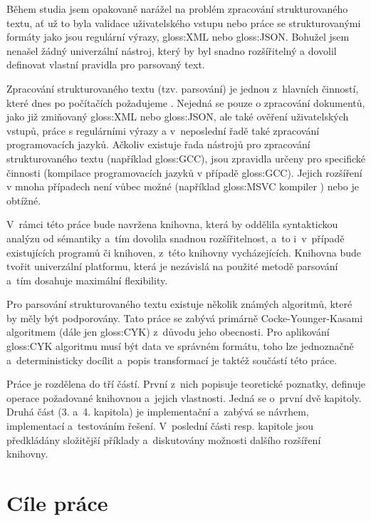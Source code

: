 \begin{introduction}
	Během studia jsem opakovaně narážel na problém zpracování strukturovaného textu, ať už to byla validace uživatelského vstupu nebo práce se strukturovanými formáty jako jsou regulární výrazy, \gls{gloss:XML} nebo \gls{gloss:JSON}. Bohužel jsem nenašel žádný univerzální nástroj, který by byl snadno rozšířitelný a dovolil definovat vlastní pravidla pro parsovaný text.
	
	Zpracování strukturovaného textu (tzv. parsování) je jednou z~hlavních činností, které dnes po počítačích požadujeme \cite{MartinKocickaLRParsing}.
	Nejedná se pouze o zpracování dokumentů, jako již zmiňovaný \gls{gloss:XML} nebo \gls{gloss:JSON}, ale také ověření uživatelských vstupů, práce s regulárními výrazy a v~neposlední řadě také zpracování programovacích jazyků. Ačkoliv existuje řada nástrojů pro zpracování strukturovaného textu (například \gls{gloss:GCC}), jsou zpravidla určeny pro specifické činnosti (kompilace programovacích jazyků v případě \gls{gloss:GCC}). Jejich rozšíření v mnoha případech není vůbec možné (například \gls{gloss:MSVC} kompiler \cite{MSVCIntermediate}) nebo je obtížné.
	
	V~rámci této práce bude navržena knihovna, která by oddělila syntaktickou analýzu od sémantiky a~tím dovolila snadnou rozšířitelnost, a~to i~v~případě existujících programů či knihoven, z~této knihovny vycházejících. Knihovna bude tvořit univerzální platformu, která je nezávislá na použité metodě parsování a~tím dosahuje maximální flexibility.
	
	Pro parsování strukturovaného textu existuje několik známých algoritmů, které by měly být podporovány. Tato práce se zabývá primárně Cocke-Younger-Kasami algoritmem (dále jen \gls{gloss:CYK}) z~důvodu jeho obecnosti. Pro aplikování \gls{gloss:CYK} algoritmu musí být data ve správném formátu, toho lze jednoznačně a~deterministicky docílit a~popis transformací je taktéž součástí této práce.
	
	Práce je rozdělena do tří částí. První z~nich popisuje teoretické poznatky, definuje operace požadované knihovnou a~jejich vlastnosti. Jedná se o~první dvě kapitoly. Druhá část (3. a~4. kapitola) je implementační a~zabývá se návrhem, implementací a~testováním řešení. V~poslední části resp. kapitole jsou předkládány složitější příklady a~diskutovány možnosti dalšího rozšíření knihovny.
\end{introduction}

\chapter*{Cíle práce}
	
